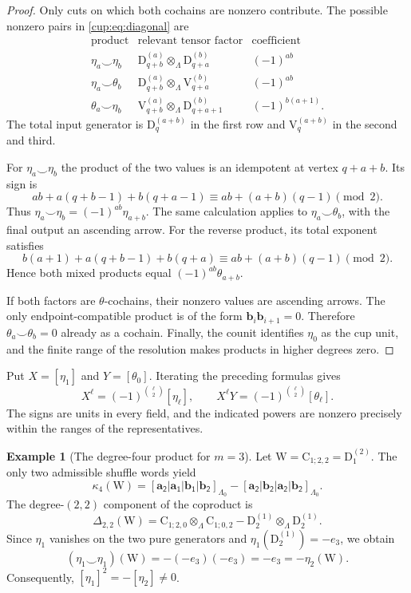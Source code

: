 \documentclass[a4paper,11pt,oneside,reqno]{amsart}
\theoremstyle{definition}
\newtheorem{example}[theorem]{Example}
\numberwithin{equation}{section}
\begin{document}
\begin{proof}
Only cuts on which both cochains are nonzero contribute.
The possible nonzero pairs in \eqref{cup:eq:diagonal} are
\begin{equation}\label{cup:eq:surviving-cuts}
\begin{array}{c|c|c}
 \text{product}&\text{relevant tensor factor}&\text{coefficient}\\\hline
 \eta_a\smile\eta_b&
 \mathrm D_{q+b}^{(a)}\otimes_\Lambda\mathrm D_{q+a}^{(b)}
 &(-1)^{ab}\\
 \eta_a\smile\theta_b&
 \mathrm D_{q+b}^{(a)}\otimes_\Lambda\mathrm V_{q+a}^{(b)}
 &(-1)^{ab}\\
 \theta_a\smile\eta_b&
 \mathrm V_{q+b}^{(a)}\otimes_\Lambda\mathrm D_{q+a+1}^{(b)}
 &(-1)^{b(a+1)}.
\end{array}
\end{equation}
The total input generator is $\mathrm D_q^{(a+b)}$ in the
first row and $\mathrm V_q^{(a+b)}$ in the second and third.

For $\eta_a\smile\eta_b$ the product of the two values is an
idempotent at vertex $q+a+b$. Its sign is
\[
 ab+a(q+b-1)+b(q+a-1)
 \equiv ab+(a+b)(q-1)\pmod2.
\]
Thus $\eta_a\smile\eta_b=(-1)^{ab}\eta_{a+b}$.
The same calculation applies to $\eta_a\smile\theta_b$,
with the final output an ascending arrow. For the reverse product,
its total exponent satisfies
\[
 b(a+1)+a(q+b-1)+b(q+a)
 \equiv ab+(a+b)(q-1)\pmod2.
\]
Hence both mixed products equal $(-1)^{ab}\theta_{a+b}$.

If both factors are $\theta$-cochains, their nonzero values are
ascending arrows. The only endpoint-compatible product is of the
form $\mathbf b_i\mathbf b_{i+1}=0$. Therefore
$\theta_a\smile\theta_b=0$ already as a cochain. Finally, the
counit identifies $\eta_0$ as the cup unit, and the finite range
of the resolution makes products in higher degrees zero.
\end{proof}

Put $X=[\eta_1]$ and $Y=[\theta_0]$. Iterating the preceding
formulas gives
\begin{equation}\label{cup:eq:powers}
 \boxed{
 X^\ell=(-1)^{\binom\ell2}[\eta_\ell],
 \qquad
 X^\ell Y=(-1)^{\binom\ell2}[\theta_\ell].}
\end{equation}
The signs are units in every field, and the indicated powers are
nonzero precisely within the ranges of the representatives.

\begin{example}[The degree-four product for $m=3$]\label{cup:ex:m3}
Let $\mathrm W=\mathrm C_{1;2,2}=\mathrm D_1^{(2)}$. The only two
admissible shuffle words yield
\[
 \kappa_4(\mathrm W)
 =\mathsf{[\mathbf a_2|\mathbf a_1|\mathbf b_1|\mathbf b_2]}_{\Lambda_0}
 -\mathsf{[\mathbf a_2|\mathbf b_2|\mathbf a_2|\mathbf b_2]}_{\Lambda_0}.
\]
The degree-$(2,2)$ component of the coproduct is
\[
 \Delta_{2,2}(\mathrm W)
 =\mathrm C_{1;2,0}\otimes_\Lambda\mathrm C_{1;0,2}
 -\mathrm D_2^{(1)}\otimes_\Lambda\mathrm D_2^{(1)}.
\]
Since $\eta_1$ vanishes on the two pure generators and
$\eta_1(\mathrm D_2^{(1)})=-e_3$, we obtain
\[
 (\eta_1\smile\eta_1)(\mathrm W)
 =-(-e_3)(-e_3)=-e_3=-\eta_2(\mathrm W).
\]
Consequently, $[\eta_1]^2=-[\eta_2]\ne0$.
\end{example}
\end{document}
